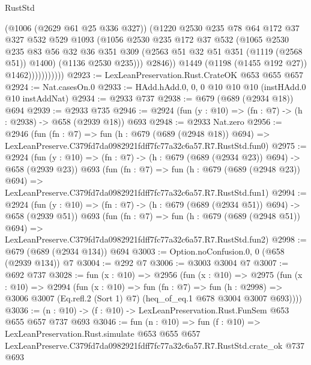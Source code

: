 \begin{lexlean}{RustStd}
\begin{coremodule}
                            (@1006 (@2629 @61 @25 @336 @327))
                            (@1220
                              @2530
                              @235
                              @78
                              @64
                              @172
                              @37
                              @327
                              @532
                              @529
                              @1093
                              (@1056
                                @2530
                                @235
                                @172
                                @37
                                @532
                                (@1065
                                  @2530
                                  @235
                                  @83
                                  @56
                                  @32
                                  @36
                                  @351
                                  @309
                                  (@2563 @51 @32 @51 @351 (@1119 (@2568 @51)) @1400)
                                  (@1136 @2530 @235)))
                              @2846))
                          @1449
                          (@1198 (@1455 @192 @27))
                          @1462)))))))))))
@2923 := LexLeanPreservation.Rust.CrateOK @653 @655 @657
@2924 := Nat.casesOn.{0}
@2933 := HAdd.hAdd.{0, 0, 0} @10 @10 @10 (instHAdd.{0} @10 instAddNat)
@2934 := @2933 @737
@2938 := @679 (@689 (@2934 @18)) @694
@2939 := @2933 @735
@2946 := @2924 (fun (y : @10) => (fn : @7) -> (h : @2938) -> @658 (@2939 @18)) @693
@2948 := @2933 Nat.zero
@2956 := @2946
    (fun (fn : @7) =>
    fun (h : @679 (@689 (@2948 @18)) @694) =>
    LexLeanPreserve.C379fd7da0982921fdff7fc77a32c6a57.R7.RustStd.fun0)
@2975 := @2924
    (fun (y : @10) => (fn : @7) -> (h : @679 (@689 (@2934 @23)) @694) -> @658 (@2939 @23))
    @693
    (fun (fn : @7) =>
    fun (h : @679 (@689 (@2948 @23)) @694) =>
    LexLeanPreserve.C379fd7da0982921fdff7fc77a32c6a57.R7.RustStd.fun1)
@2994 := @2924
    (fun (y : @10) => (fn : @7) -> (h : @679 (@689 (@2934 @51)) @694) -> @658 (@2939 @51))
    @693
    (fun (fn : @7) =>
    fun (h : @679 (@689 (@2948 @51)) @694) =>
    LexLeanPreserve.C379fd7da0982921fdff7fc77a32c6a57.R7.RustStd.fun2)
@2998 := @679 (@689 (@2934 @134)) @694
@3003 := Option.noConfusion.{0, 0} (@658 (@2939 @134)) @7
@3004 := @292 @7
@3006 := @3003 @3004 @7
@3007 := @692 @737
@3028 := fun (x : @10) =>
  @2956
    (fun (x : @10) =>
    @2975
      (fun (x : @10) =>
      @2994
        (fun (x : @10) =>
        fun (fn : @7) =>
        fun (h : @2998) =>
        @3006 @3007 (Eq.refl.{2} (Sort 1) @7) (heq_of_eq.{1} @678 @3004 @3007 @693))))
@3036 := (n : @10) -> (f : @10) -> LexLeanPreservation.Rust.FunSem @653 @655 @657 @737 @693
@3046 := fun (n : @10) =>
  fun (f : @10) =>
  LexLeanPreservation.Rust.simulate
    @653
    @655
    @657
    LexLeanPreserve.C379fd7da0982921fdff7fc77a32c6a57.R7.RustStd.crate_ok
    @737
    @693
\end{coremodule}
\end{lexlean}
